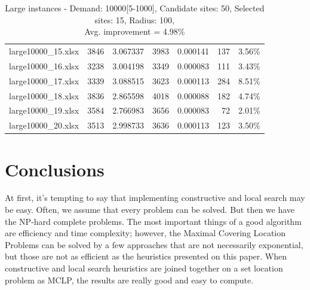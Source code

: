 \documentclass[11pt, a4paper]{article}
\begin{document}
\begin{table}[h!]
\begin{adjustbox}{max width=\textwidth}
\begin{tabular}{lrrrrrl}
		 large10000\_15.xlsx &   3846 &           3.067337 &    3983 &           0.000141 &           137 &        3.56\% \\
		 large10000\_16.xlsx &   3238 &           3.004198 &    3349 &           0.000083 &           111 &        3.43\% \\
		 large10000\_17.xlsx &   3339 &           3.088515 &    3623 &           0.000113 &           284 &        8.51\% \\
		 large10000\_18.xlsx &   3836 &           2.865598 &    4018 &           0.000088 &           182 &        4.74\% \\
		 large10000\_19.xlsx &   3584 &           2.766983 &    3656 &           0.000083 &            72 &        2.01\% \\
		 large10000\_20.xlsx &   3513 &           2.998733 &    3636 &           0.000113 &           123 &        3.50\% \\
		\bottomrule
		\end{tabular}		
\end{adjustbox}
\caption{Large instances - Demand: 10000[5-1000], Candidate sites: 50, Selected sites: 15, Radius: 100,\\ \centering Avg. improvement = 4.98\%}
\label{tab:large_instances}
\end{table}

\section{Conclusions}
At first, it's tempting to say that implementing constructive and local search may be easy. Often, we assume that every problem can be solved. But then we have the NP-hard complete problems. The most important things of a good algorithm are efficiency and time complexity; however, the Maximal Covering Location Problems can be solved by a few approaches that are not necessarily exponential, but those are not as efficient as the heuristics presented on this paper. When constructive and local search heuristics are joined together on a set location problem as MCLP, the results are really good and easy to compute.

\appendix
\small \singlespacing
 

\end{document}
